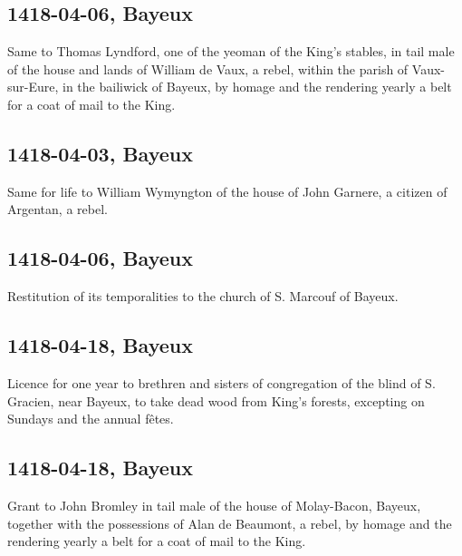 \documentclass[a4paper,12pt,twoside]{book}
\begin{document}
                
                \subsection{1418-04-06, Bayeux}
                
                
                     Same to Thomas Lyndford, one of the yeoman of the King's stables, in tail male of the house and lands of William de Vaux, a rebel, within the parish of Vaux-sur-Eure, in the bailiwick of Bayeux, by homage and the rendering yearly a belt for a coat of mail to the King.
                  
                
                \subsection{1418-04-03, Bayeux}
                
                
                     Same for life to William Wymyngton of the house of John Garnere, a citizen of Argentan, a rebel.
                  
                
                \subsection{1418-04-06, Bayeux}
                
                
                     Restitution of its temporalities to the church of S. Marcouf of Bayeux.
                  
                
                \subsection{1418-04-18, Bayeux}
                
                
                     Licence for one year to brethren and sisters of congregation of the blind of S. Gracien, near Bayeux, to take dead wood from King's forests, excepting on Sundays and the annual fêtes.
                  
                
                \subsection{1418-04-18, Bayeux}
                
                
                     Grant to John Bromley in tail male of the house of Molay-Bacon, Bayeux, together with the possessions of Alan de Beaumont, a rebel, by homage and the rendering yearly a belt for a coat of mail to the King.
                  
\end{document}

